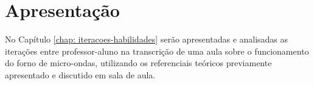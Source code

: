 \chapter[Apresentação]{Apresentação}
No Capítulo \ref{chap: iteracoes-habilidades} serão apresentadas e analisadas as iterações entre professor-aluno na transcrição de uma aula sobre o funcionamento do forno de micro-ondas, utilizando os referenciais teóricos previamente apresentado e discutido em sala de aula.

	
